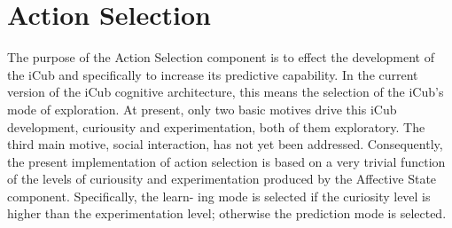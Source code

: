 \documentclass[a4paper, 11pt]{report}
\begin{document}
\section{Action Selection}
The purpose of the Action Selection component is to effect the development of 
the iCub and specifically to increase its predictive capability. In the current 
version of the iCub cognitive architecture, this means the selection of the 
iCub’s mode of exploration. At present, only two basic motives drive this iCub 
development, curiousity and experimentation, both of them exploratory. The 
third main motive, social interaction, has not yet been addressed.\cite{10} 
Consequently, the present implementation of action selection is based on a very 
trivial function of the levels of curiousity and experimentation produced by 
the Affective State component. Specifically, the learn- ing mode is selected if 
the curiosity level is higher than the experimentation level; otherwise the 
prediction mode is selected.
\end{document}
